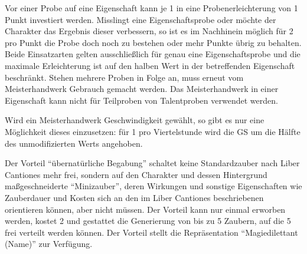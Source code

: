 Vor einer Probe auf eine Eigenschaft kann je \SI{1}{\AsP} in eine Probenerleichterung von 1 Punkt investiert werden. Misslingt eine Eigenschaftsprobe oder möchte der Charakter das Ergebnis dieser verbessern, so ist es im Nachhinein möglich für \SI{2}{\AsP} pro Punkt die Probe doch noch zu bestehen oder mehr Punkte übrig zu behalten. Beide Einsatzarten gelten ausschließlich für genau eine Eigenschaftsprobe und die maximale Erleichterung ist auf den halben Wert in der betreffenden Eigenschaft beschränkt. Stehen mehrere Proben in Folge an, muss erneut vom Meisterhandwerk Gebrauch gemacht werden. Das Meisterhandwerk in einer Eigenschaft kann nicht für Teilproben von Talentproben verwendet werden.

Wird ein Meisterhandwerk Geschwindigkeit gewählt, so gibt es nur eine Möglichkeit dieses einzusetzen: für \SI{1}{\AsP} pro Viertelstunde wird die GS um die Hälfte des unmodifizierten Werts angehoben.

Der Vorteil \enquote{übernatürliche Begabung} schaltet keine Standardzauber nach Liber Cantiones mehr frei, sondern auf den Charakter und dessen Hintergrund maßgeschneiderte \enquote{Minizauber}, deren Wirkungen und sonstige Eigenschaften wie Zauberdauer und Kosten sich an den im Liber Cantiones beschriebenen orientieren können, aber nicht müssen. Der Vorteil kann nur einmal erworben werden, kostet \SI{2}{\GP} und gestattet die Generierung von bis zu 5 Zaubern, auf die \SI{5}{\ZfP} frei verteilt werden können. Der Vorteil stellt die Repräsentation \enquote{Magiedilettant (Name)} zur Verfügung.

